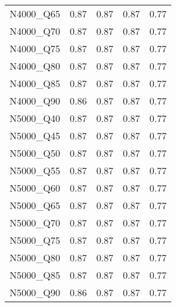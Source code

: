 \begin{table}[ht]
\begin{tabular}{rrrrr}
  N4000\_Q65 & 0.87 & 0.87 & 0.87 & 0.77 \\ 
  N4000\_Q70 & 0.87 & 0.87 & 0.87 & 0.77 \\ 
  N4000\_Q75 & 0.87 & 0.87 & 0.87 & 0.77 \\ 
  N4000\_Q80 & 0.87 & 0.87 & 0.87 & 0.77 \\ 
  N4000\_Q85 & 0.87 & 0.87 & 0.87 & 0.77 \\ 
  N4000\_Q90 & 0.86 & 0.87 & 0.87 & 0.77 \\ 
  N5000\_Q40 & 0.87 & 0.87 & 0.87 & 0.77 \\ 
  N5000\_Q45 & 0.87 & 0.87 & 0.87 & 0.77 \\ 
  N5000\_Q50 & 0.87 & 0.87 & 0.87 & 0.77 \\ 
  N5000\_Q55 & 0.87 & 0.87 & 0.87 & 0.77 \\ 
  N5000\_Q60 & 0.87 & 0.87 & 0.87 & 0.77 \\ 
  N5000\_Q65 & 0.87 & 0.87 & 0.87 & 0.77 \\ 
  N5000\_Q70 & 0.87 & 0.87 & 0.87 & 0.77 \\ 
  N5000\_Q75 & 0.87 & 0.87 & 0.87 & 0.77 \\ 
  N5000\_Q80 & 0.87 & 0.87 & 0.87 & 0.77 \\ 
  N5000\_Q85 & 0.87 & 0.87 & 0.87 & 0.77 \\ 
  N5000\_Q90 & 0.86 & 0.87 & 0.87 & 0.77 \\ 
   \hline
\end{tabular}
\end{table}
